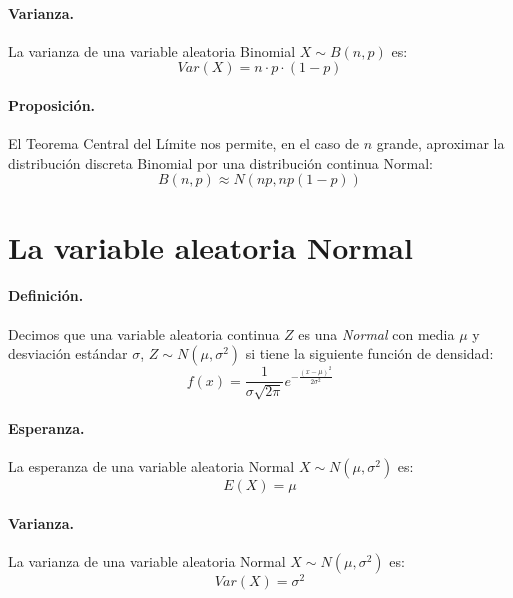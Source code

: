 \paragraph{Varianza.} La varianza de una variable aleatoria Binomial 
$X \sim B(n,p)$ es:
\begin{displaymath}
Var(X)= n \cdot p \cdot (1-p)
\end{displaymath}

\paragraph{Proposici\'on.} El Teorema Central del L\'imite nos permite, en el
caso de $n$ grande, aproximar la distribuci\'on discreta Binomial por una
distribuci\'on continua Normal:
\begin{displaymath}
B(n,p) \approx N\left(n p, n p (1-p)\right)
\end{displaymath}



\section{La variable aleatoria Normal}

\paragraph{Definici\'on.} Decimos que una variable aleatoria continua $Z$ es 
una \emph{Normal} con media $\mu$ y desviaci\'on est\'andar $\sigma$, 
$Z \sim N(\mu, \sigma^2)$ si tiene la siguiente funci\'on de densidad:
\begin{displaymath}
f(x) = \frac{1}{\sigma \sqrt{2 \pi}} e^{-\frac{(x-\mu)^2}{2 \sigma^2}}
\end{displaymath}

\paragraph{Esperanza.} La esperanza de una variable aleatoria Normal 
$X \sim N(\mu,\sigma^2)$ es:
\begin{displaymath}
E(X) = \mu
\end{displaymath}

\paragraph{Varianza.} La varianza de una variable aleatoria Normal 
$X \sim N(\mu,\sigma^2)$ es:
\begin{displaymath}
Var(X)= \sigma^2
\end{displaymath}

